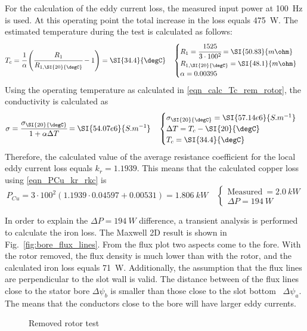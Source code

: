 For the calculation of the eddy current loss, the measured input power at \SI{100}{Hz} is used. At this operating point the total increase in the loss equals \SI{475}{W}. The estimated temperature during the test is calculated as follows:
\begin{equation}
  \label{eqn_calc_Tc_rem_rotor}
  T_c = \cfrac{1}{\alpha}\left(\cfrac{R_1}{R_{1,\SI{20}{\degC}}}-1\right)=%
  \SI{34.4}{\degC}
  \quad
  \begin{cases}
  R_1 = \cfrac{1525}{3\cdot 100^2}=\SI{50.83}{m\ohm} \\
  R_{1,\SI{20}{\degC}}=\SI{48.1}{m\ohm} \\
  \alpha = 0.00395
  \end{cases}
\end{equation}
Using the operating temperature as calculated in \eqref{eqn_calc_Tc_rem_rotor}, the conductivity is calculated as
\begin{equation}
  \sigma = \cfrac{\sigma_{\SI{20}{\degC}}}{1+\alpha \Delta T}=\SI{54.07e6}{S.m^{-1}}
  \quad
  \begin{cases}
  \sigma_{\SI{20}{\degC}} = \SI{57.14e6}{S.m^{-1}} \\
  \Delta T = T_c-\SI{20}{\degC} \\
  T_c = \SI{34.4}{\degC}
  \end{cases}
\end{equation}
Therefore, the calculated value of the average resistance coefficient for the local eddy current loss equals $k_r=1.1939$. This means that the calculated copper loss using \eqref{eqn_PCu_kr_rkc} is
\begin{equation}
  P_{Cu}=3\cdot 100^{2}(1.1939\cdot 0.04597 + 0.00531)=\SI{1.806}{kW}
  \quad
  \begin{cases}
  \mbox{Measured}\:=\SI{2.0}{kW} \\
  \Delta P = \SI{194}{W}
  \end{cases}
\end{equation}

In order to explain the $\Delta P=\SI{194}{W}$ difference, a transient analysis is performed to calculate the iron loss. The Maxwell 2D result is shown in Fig.~\ref{fig:bore_flux_lines}. From the flux plot two aspects come to the fore. With the rotor removed, the flux density is much lower than with the rotor, and the calculated iron loss equals \SI{71}{W}. Additionally, the assumption that the flux lines are perpendicular to the slot wall is valid. The distance between of the flux lines close to the stator bore $\Delta \psi_b$ is smaller than those close to the slot bottom~%
$\Delta \psi_a$. The means that the conductors close to the bore will have larger eddy currents.
\begin{figure}[htbp]
	\centering
	
  \vspace{0.2cm}
	
	\caption{Removed rotor test}
	\label{fig:Main_removed_rotor}
\end{figure}

